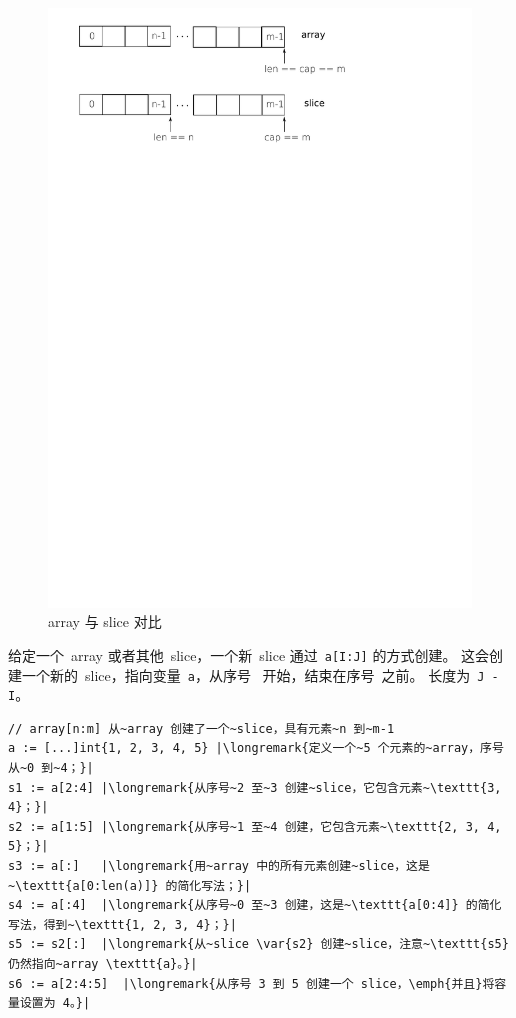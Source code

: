 \begin{figure}[H]
\caption{array 与 slice 对比}
\label{fig:array-vs-slice}
\begin{center}
\includegraphics[scale=0.65]{fig/array-vs-slice.pdf}
\end{center}
\end{figure}

给定一个~array 或者其他~slice，一个新~slice 通过~\lstinline{a[I:J]}
的方式创建。
这会创建一个新的~slice，指向变量~\lstinline{a}，从序号~ 开始，结束在序号~之前。
长度为~\lstinline{J - I}。

\begin{lstlisting}
// array[n:m] 从~array 创建了一个~slice，具有元素~n 到~m-1
a := [...]int{1, 2, 3, 4, 5} |\longremark{定义一个~5 个元素的~array，序号从~0 到~4；}|
s1 := a[2:4] |\longremark{从序号~2 至~3 创建~slice，它包含元素~\texttt{3, 4}；}|
s2 := a[1:5] |\longremark{从序号~1 至~4 创建，它包含元素~\texttt{2, 3, 4, 5}；}|
s3 := a[:]   |\longremark{用~array 中的所有元素创建~slice，这是~\texttt{a[0:len(a)]} 的简化写法；}|
s4 := a[:4]  |\longremark{从序号~0 至~3 创建，这是~\texttt{a[0:4]} 的简化写法，得到~\texttt{1, 2, 3, 4}；}|
s5 := s2[:]  |\longremark{从~slice \var{s2} 创建~slice，注意~\texttt{s5} 仍然指向~array \texttt{a}。}|
s6 := a[2:4:5]  |\longremark{从序号 3 到 5 创建一个 slice，\emph{并且}将容量设置为 4。}|
\end{lstlisting}
\showremarks

